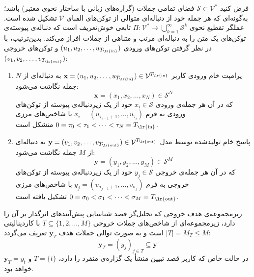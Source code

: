 \begin{definition}\label{def:chap1_proposition_space}
فرض کنید $\mathcal{S} \subset \mathcal{V}^*$ فضای تمامی جملات (گزاره‌های زبانی با ساختار نحوی معتبر) باشد؛ به‌گونه‌ای که هر جمله خود از دنباله‌ای متوالی از توکن‌های الفبای $\mathcal{V}$ تشکیل شده است. عملگر تقطیع نحوی $\Pi: \mathcal{V}^* \to \bigcup_{k=1}^\infty \mathcal{S}^k$ تابعی خوش‌تعریف است که دنباله‌ی پیوسته‌ی توکن‌های یک متن را به دنباله‌ای مرتب و متناهی از جملات افراز می‌کند. بدین‌ترتیب، با در نظر گرفتن توکن‌های ورودی $(u_1, u_2, \ldots, u_{T_{\text{\lr{in}}}})$ و توکن‌های خروجی $(v_1, v_2, \ldots, v_{T_{\text{\lr{out}}}})$:
\begin{enumerate}
    \item پرامپت خام ورودی کاربر $\mathbf{x} = (u_1, u_2, \ldots, u_{T_{\text{\lr{in}}}}) \in \mathcal{V}^{T_{\text{\lr{in}}}}$ به دنباله‌ای از $N$ جمله نگاشت می‌شود:
    \begin{equation}\label{eq:chap1_prompt_decomp}
        \mathbf{x} = (x_1, x_2, \ldots, x_N) \in \mathcal{S}^N
    \end{equation}
    که در آن هر جمله‌ی ورودی $x_i \in \mathcal{S}$ خود از یک زیردنباله‌ی پیوسته از توکن‌های ورودی به فرم $x_i = (u_{\tau_{i-1}+1}, \ldots, u_{\tau_i})$ با شاخص‌های مرزی $0 = \tau_0 < \tau_1 < \cdots < \tau_N = T_{\text{\lr{in}}}$ متشکل است.
    \item پاسخ خام تولیدشده توسط مدل $\mathbf{y} = (v_1, v_2, \ldots, v_{T_{\text{\lr{out}}}}) \in \mathcal{V}^{T_{\text{\lr{out}}}}$ به دنباله‌ای از $M$ جمله نگاشت می‌شود:
    \begin{equation}\label{eq:chap1_response_decomp}
        \mathbf{y} = (y_1, y_2, \ldots, y_M) \in \mathcal{S}^M
    \end{equation}
    که در آن هر جمله‌ی خروجی $y_j \in \mathcal{S}$ خود از یک زیردنباله‌ی پیوسته از توکن‌های خروجی به فرم $y_j = (v_{\sigma_{j-1}+1}, \ldots, v_{\sigma_j})$ با شاخص‌های مرزی $0 = \sigma_0 < \sigma_1 < \cdots < \sigma_M = T_{\text{\lr{out}}}$ تشکیل یافته است.
\end{enumerate}
\end{definition}

\begin{definition}\label{def:chap1_target_subset}
زیرمجموعه‌ی هدف خروجی که تحلیل‌گر قصد شناسایی پیش‌آیندهای اثرگذار بر آن را دارد، زیرمجموعه‌ای از شاخص‌های جملات خروجی $T \subseteq \{1, 2, \ldots, M\}$ با کاردینالیتی $|T| = M_T \le M$ است و به صورت توالی جملات هدف $\mathbf{y}_T$ تعریف می‌گردد:
\begin{equation}\label{eq:chap1_target_decomp}
    \mathbf{y}_T = {(y_j)}_{j \in T} \subseteq \mathbf{y}
\end{equation}
در حالت خاص که کاربر قصد تبیین منشأ یک گزاره‌ی منفرد را دارد، $T = \{t\}$ و $\mathbf{y}_T = y_t$ خواهد بود.
\end{definition}

